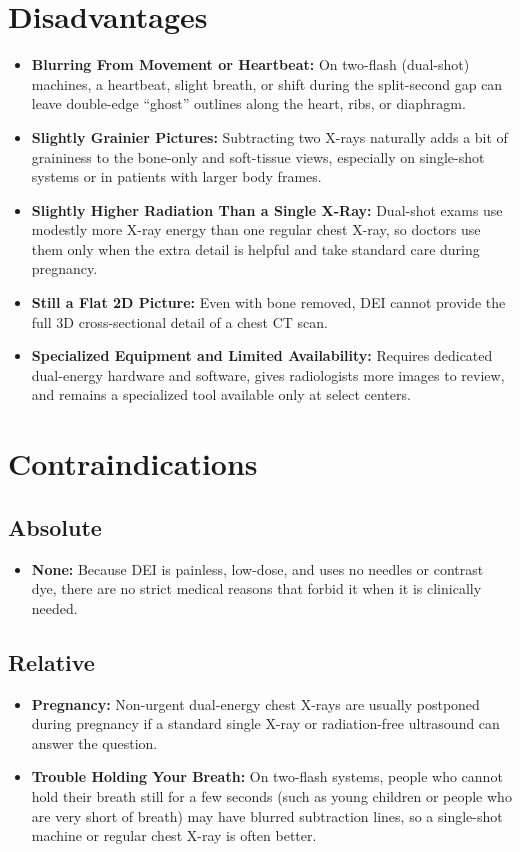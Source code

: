 \section{Disadvantages}
\begin{itemize}
    \item \textbf{Blurring From Movement or Heartbeat:} On two-flash (dual-shot) machines, a heartbeat, slight breath, or shift during the split-second gap can leave double-edge ``ghost'' outlines along the heart, ribs, or diaphragm.
    \item \textbf{Slightly Grainier Pictures:} Subtracting two X-rays naturally adds a bit of graininess to the bone-only and soft-tissue views, especially on single-shot systems or in patients with larger body frames.
    \item \textbf{Slightly Higher Radiation Than a Single X-Ray:} Dual-shot exams use modestly more X-ray energy than one regular chest X-ray, so doctors use them only when the extra detail is helpful and take standard care during pregnancy.
    \item \textbf{Still a Flat 2D Picture:} Even with bone removed, DEI cannot provide the full 3D cross-sectional detail of a chest CT scan.
    \item \textbf{Specialized Equipment and Limited Availability:} Requires dedicated dual-energy hardware and software, gives radiologists more images to review, and remains a specialized tool available only at select centers.
\end{itemize}

\section{Contraindications}

\subsection{Absolute}
\begin{itemize}
    \item \textbf{None:} Because DEI is painless, low-dose, and uses no needles or contrast dye, there are no strict medical reasons that forbid it when it is clinically needed.
\end{itemize}

\subsection{Relative}
\begin{itemize}
    \item \textbf{Pregnancy:} Non-urgent dual-energy chest X-rays are usually postponed during pregnancy if a standard single X-ray or radiation-free ultrasound can answer the question.
    \item \textbf{Trouble Holding Your Breath:} On two-flash systems, people who cannot hold their breath still for a few seconds (such as young children or people who are very short of breath) may have blurred subtraction lines, so a single-shot machine or regular chest X-ray is often better.
\end{itemize}

